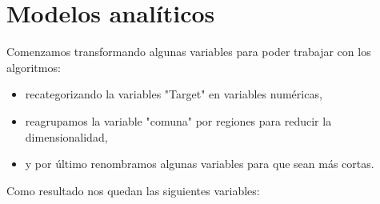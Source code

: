 \documentclass[a4paper]{article}
\begin{document}
\section{Modelos analíticos}

    Comenzamos transformando algunas variables para poder trabajar con los algoritmos:
    \begin{itemize}
        \item recategorizando la variables "Target" en variables numéricas,
        \item reagrupamos la variable "comuna" por regiones para reducir la dimensionalidad,
        \item y por último renombramos algunas variables para que sean más cortas.
    \end{itemize}

    Como resultado nos quedan las siguientes variables:
    
\end{document}
